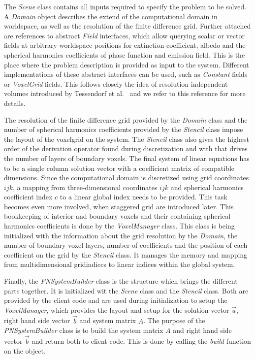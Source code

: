 The \emph{Scene} class contains all inputs required to specify the problem to be solved. A \emph{Domain} object describes the extend of the computational domain in worldspace, as well as the resolution of the finite difference grid. Further attached are references to abstract \emph{Field} interfaces, which allow querying scalar or vector fields at arbitrary worldspace positions for extinction coefficient, albedo and the spherical harmonics coefficients of phase function and emission field. This is the place where the problem description is provided as input to the system. Different implementations of these abstract interfaces can be used, such as \emph{Constant} fields or \emph{VoxelGrid} fields. This follows closely the idea of resolution independent volumes introduced by Tessendorf et al.~\cite{Tessendorf11} and we refer to this reference for more details.

The resolution of the finite difference grid provided by the \emph{Domain} class and the number of spherical harmonics coefficients provided by the \emph{Stencil} class impose the layout of the voxelgrid on the system. The \emph{Stencil} class also gives the highest order of the derivation operator found during discretization and with that drives the number of layers of boundary voxels. The final system of linear equations has to be a single column solution vector with a coefficient matrix of compatible dimensions. Since the computational domain is discretized using grid coordinates $ijk$, a mapping from three-dimensional coordinates $ijk$ and spherical harmonics coefficient index $c$ to a linear global index needs to be provided. This task becomes even more involved, when staggered grid are introduced later. This bookkeeping of interior and boundary voxels and their containing spherical harmonics coefficients is done by the \emph{VoxelManager} class. This class is being initialized with the information about the grid resolution by the \emph{Domain}, the number of boundary voxel layers, number of coefficients and the position of each coefficient on the grid by the \emph{Stencil} class. It manages the memory and mapping from multidimensional gridindices to linear indices within the global system.

Finally, the \emph{PNSystemBuilder} class is the structure which brings the different parts together. It is initialized wit the \emph{Scene} class and the \emph{Stencil} class. Both are provided by the client code and are used during initialization to setup the \emph{VoxelManager}, which provides the layout and setup for the solution vector $\vec{u}$, right hand side vector $\vec{b}$ and system matrix $A$. The purpose of the \emph{PNSystemBuilder} class is to build the system matrix $A$ and right hand side vector $\vec{b}$ and return both to client code. This is done by calling the \emph{build} function on the object.


